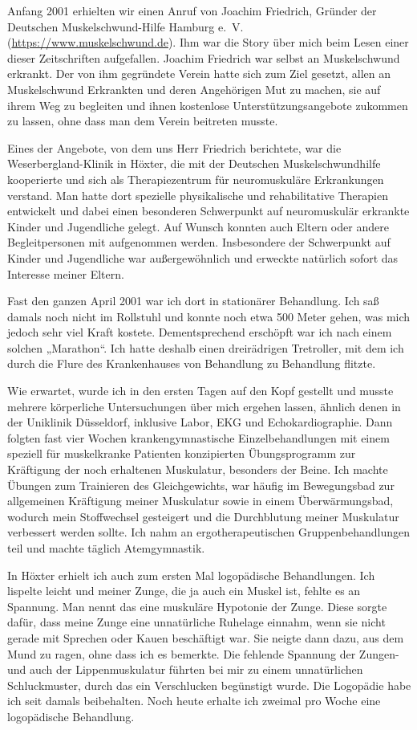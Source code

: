 \documentclass[fontsize=14pt,a4paper,headinclude,DIV=calc,automark]{scrbook}
\begin{document}
Anfang 2001 erhielten wir einen Anruf von Joachim Friedrich, Gründer der Deutschen Muskelschwund-Hilfe Hamburg e.~V. (\url{https://www.muskelschwund.de}). Ihm war die Story über mich beim Lesen einer dieser Zeitschriften aufgefallen. Joachim Friedrich war selbst an Muskelschwund erkrankt. Der von ihm gegründete Verein hatte sich zum Ziel gesetzt, allen an Muskelschwund Erkrankten und deren Angehörigen Mut zu machen, sie auf ihrem Weg zu begleiten und ihnen kostenlose Unterstützungsangebote zukommen zu lassen, ohne dass man dem Verein beitreten musste.

Eines der Angebote, von dem uns Herr Friedrich berichtete, war die Weserbergland-Klinik in Höxter, die mit der Deutschen Muskelschwundhilfe kooperierte und sich als Therapiezentrum für neuromuskuläre Erkrankungen verstand. Man hatte dort spezielle physikalische und rehabilitative Therapien entwickelt und dabei einen besonderen Schwerpunkt auf neuromuskulär erkrankte Kinder und Jugendliche gelegt. Auf Wunsch konnten auch Eltern oder andere Begleitpersonen mit aufgenommen werden. Insbesondere der Schwerpunkt auf Kinder und Jugendliche war außergewöhnlich und erweckte natürlich sofort das Interesse meiner Eltern.

Fast den ganzen April 2001 war ich dort in stationärer Behandlung. Ich saß damals noch nicht im Rollstuhl und konnte noch etwa 500 Meter gehen, was mich jedoch sehr viel Kraft kostete. Dementsprechend erschöpft war ich nach einem solchen „Marathon“. Ich hatte deshalb einen dreirädrigen Tretroller, mit dem ich durch die Flure des Krankenhauses von Behandlung zu Behandlung flitzte.

Wie erwartet, wurde ich in den ersten Tagen auf den Kopf gestellt und musste mehrere körperliche Untersuchungen über mich ergehen lassen, ähnlich denen in der Uniklinik Düsseldorf, inklusive Labor, EKG und Echokardiographie. Dann folgten fast vier Wochen krankengymnastische Einzelbehandlungen mit einem speziell für muskelkranke Patienten konzipierten Übungsprogramm zur Kräftigung der noch erhaltenen Muskulatur, besonders der Beine. Ich machte Übungen zum Trainieren des Gleichgewichts, war häufig im Bewegungsbad zur allgemeinen Kräftigung meiner Muskulatur sowie in einem Überwärmungsbad, wodurch mein Stoffwechsel gesteigert und die Durchblutung meiner Muskulatur verbessert werden sollte. Ich nahm an ergotherapeutischen Gruppenbehandlungen teil und machte täglich Atemgymnastik.

In Höxter erhielt ich auch zum ersten Mal logopädische Behandlungen. Ich lispelte leicht und meiner Zunge, die ja auch ein Muskel ist, fehlte es an Spannung. Man nennt das eine muskuläre Hypotonie der Zunge. Diese sorgte dafür, dass meine Zunge eine unnatürliche Ruhelage einnahm, wenn sie nicht gerade mit Sprechen oder Kauen beschäftigt war. Sie neigte dann dazu, aus dem Mund zu ragen, ohne dass ich es bemerkte. Die fehlende Spannung der Zungen- und auch der Lippenmuskulatur führten bei mir zu einem unnatürlichen Schluckmuster, durch das ein Verschlucken begünstigt wurde. Die Logopädie habe ich seit damals beibehalten. Noch heute erhalte ich zweimal pro Woche eine logopädische Behandlung.
\end{document}
